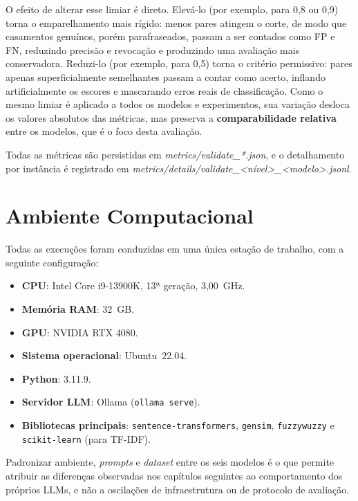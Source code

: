 O efeito de alterar esse limiar é direto. Elevá-lo (por exemplo, para 0{,}8 ou 0{,}9) torna o emparelhamento mais rígido: menos pares atingem o corte, de modo que casamentos genuínos, porém parafraseados, passam a ser contados como FP e FN, reduzindo precisão e revocação e produzindo uma avaliação mais conservadora. Reduzi-lo (por exemplo, para 0{,}5) torna o critério permissivo: pares apenas superficialmente semelhantes passam a contar como acerto, inflando artificialmente os escores e mascarando erros reais de classificação. Como o mesmo limiar é aplicado a todos os modelos e experimentos, sua variação desloca os valores absolutos das métricas, mas preserva a \textbf{comparabilidade relativa} entre os modelos, que é o foco desta avaliação.

Todas as métricas são persistidas em \textit{metrics/validate\_*.json}, e o detalhamento por instância é registrado em \textit{metrics/details/validate\_<nível>\_<modelo>.jsonl}.

\section{Ambiente Computacional}

Todas as execuções foram conduzidas em uma única estação de trabalho, com a seguinte configuração:

\begin{itemize}
    \item \textbf{CPU}: Intel Core i9-13900K, 13ª geração, 3{,}00~GHz.
    \item \textbf{Memória RAM}: 32~GB.
    \item \textbf{GPU}: NVIDIA RTX 4080.
    \item \textbf{Sistema operacional}: Ubuntu~22.04.
    \item \textbf{Python}: 3.11.9.
    \item \textbf{Servidor LLM}: Ollama (\texttt{ollama serve}).
    \item \textbf{Bibliotecas principais}: \texttt{sentence-transformers}, \texttt{gensim}, \texttt{fuzzywuzzy} e \texttt{scikit-learn} (para TF-IDF).
\end{itemize}

Padronizar ambiente, \textit{prompts} e \textit{dataset} entre os seis modelos é o que permite atribuir as diferenças observadas nos capítulos seguintes ao comportamento dos próprios LLMs, e não a oscilações de infraestrutura ou de protocolo de avaliação.
